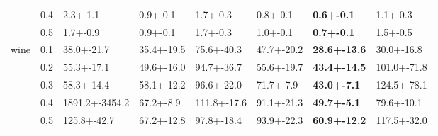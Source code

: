 \begin{tabular}{llllllll}
     & 0.4 &           2.3+-1.1 &                0.9+-0.1 &        1.7+-0.3 &        0.8+-0.1 &        \textbf{0.6+-0.1} &        1.1+-0.3 \\
     & 0.5 &           1.7+-0.9 &                0.9+-0.1 &        1.7+-0.3 &        1.0+-0.1 &        \textbf{0.7+-0.1} &        1.5+-0.5 \\
wine & 0.1 &         38.0+-21.7 &              35.4+-19.5 &      75.6+-40.3 &      47.7+-20.2 &      \textbf{28.6+-13.6} &      30.0+-16.8 \\
     & 0.2 &         55.3+-17.1 &              49.6+-16.0 &      94.7+-36.7 &      55.6+-19.7 &      \textbf{43.4+-14.5} &     101.0+-71.8 \\
     & 0.3 &         58.3+-14.4 &              58.1+-12.2 &      96.6+-22.0 &       71.7+-7.9 &       \textbf{43.0+-7.1} &     124.5+-78.1 \\
     & 0.4 &     1891.2+-3454.2 &               67.2+-8.9 &     111.8+-17.6 &      91.1+-21.3 &       \textbf{49.7+-5.1} &      79.6+-10.1 \\
     & 0.5 &        125.8+-42.7 &              67.2+-12.8 &      97.8+-18.4 &      93.9+-22.3 &      \textbf{60.9+-12.2} &     117.5+-32.0 \\
\bottomrule
\end{tabular}



